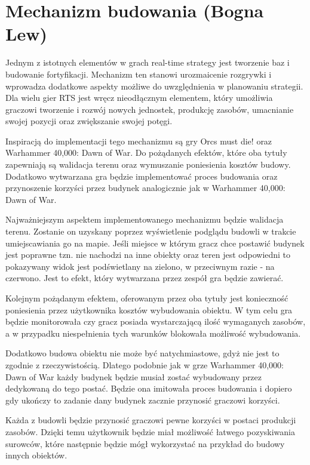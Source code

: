 \section{Mechanizm budowania (Bogna Lew)}\label{chap:build}
Jednym z istotnych elementów w grach real-time strategy jest tworzenie baz i budowanie fortyfikacji. Mechanizm ten
stanowi urozmaicenie rozgrywki i wprowadza dodatkowe aspekty możliwe do uwzględnienia w planowaniu strategii. Dla wielu
gier RTS jest wręcz nieodłącznym elementem, który umożliwia graczowi tworzenie i rozwój nowych jednostek, produkcję
zasobów, umacnianie swojej pozycji oraz zwiększanie swojej potęgi.

Inspiracją do implementacji tego mechanizmu są gry Orcs must die! oraz Warhammer 40,000: Dawn of War. Do pożądanych
efektów, które oba tytuły zapewniają są walidacja terenu oraz wymuszanie poniesienia kosztów budowy. Dodatkowo
wytwarzana gra będzie implementować proces budowania oraz przynoszenie korzyści przez budynek analogicznie jak w
Warhammer 40,000: Dawn of War.

Najważniejszym aspektem implementowanego mechanizmu będzie walidacja terenu. Zostanie on uzyskany poprzez wyświetlenie
podglądu budowli w trakcie umiejscawiania go na mapie. Jeśli miejsce w którym gracz chce postawić budynek jest poprawne
tzn. nie nachodzi na inne obiekty oraz teren jest odpowiedni to pokazywany widok jest podświetlany na zielono, w
przeciwnym razie - na czerwono. Jest to efekt, który wytwarzana przez zespół gra będzie zawierać.

Kolejnym pożądanym efektem, oferowanym przez oba tytuły jest konieczność poniesienia przez użytkownika kosztów
wybudowania obiektu. W tym celu gra będzie monitorowała czy gracz posiada wystarczającą ilość wymaganych zasobów, a w
przypadku niespełnienia tych warunków blokowała możliwość wybudowania.

Dodatkowo budowa obiektu nie może być natychmiastowe, gdyż nie jest to zgodnie z rzeczywistością. Dlatego podobnie jak w
grze Warhammer 40,000: Dawn of War każdy budynek będzie musiał zostać wybudowany przez dedykowaną do tego postać. Będzie
ona imitowała proces budowania i dopiero gdy ukończy to zadanie dany budynek zacznie przynosić graczowi korzyści.

Każda z budowli będzie przynosić graczowi pewne korzyści w postaci produkcji zasobów. Dzięki temu użytkownik będzie miał
możliwość łatwego pozyskiwania surowców, które następnie będzie mógł wykorzystać na przykład do budowy innych obiektów.
